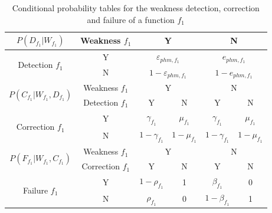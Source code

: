 \renewcommand{\arraystretch}{1.5}
\begin{table}[t] \small
\centering
\caption{Conditional probability tables for the weakness detection, correction and failure of a function $f_1$}
\label{tab:cpt_dcf}
\begin{tabular}{|c|c|c|c|c|c|}
\hline
$P(D_{f_1} | W_{f_1})$                           & Weakness $f_1$   & \multicolumn{2}{c|}{Y}                          & \multicolumn{2}{c|}{N}                \\ \hline
\multirow{2}{*}{Detection $f_1$}                 & Y                & \multicolumn{2}{c|}{$\varepsilon_{phm, f_1}$}   & \multicolumn{2}{c|}{$e_{phm, f_1}$}   \\ \cline{2-6} 
                                                 & N                & \multicolumn{2}{c|}{$1-\varepsilon_{phm, f_1}$} & \multicolumn{2}{c|}{$1-e_{phm, f_1}$} \\ \hline \hline
\multirow{2}{*}{$P(C_{f_1} | W_{f_1}, D_{f_1})$} & Weakness $f_1$   & \multicolumn{2}{c|}{Y}                          & \multicolumn{2}{c|}{N}                \\ \cline{2-6} 
                                                 & Detection $f_1$  & Y                        & N                    & Y                   & N               \\ \hline
\multirow{2}{*}{Correction $f_1$}                & Y                & $\gamma_{f_1}$           & $\mu_{f_1}$          & $\gamma_{f_1}$      & $\mu_{f_1}$     \\ \cline{2-6} 
                                                 & N                & $1-\gamma_{f_1}$         & $1-\mu_{f_1}$        & $1-\gamma_{f_1}$    & $1-\mu_{f_1}$   \\ \hline \hline
\multirow{2}{*}{$P(F_{f_1} | W_{f_1}, C_{f_1})$} & Weakness $f_1$   & \multicolumn{2}{c|}{Y}                          & \multicolumn{2}{c|}{N}                \\ \cline{2-6} 
                                                 & Correction $f_1$ & Y                        & N                    & Y                   & N               \\ \hline
\multirow{2}{*}{Failure $f_1$}                   & Y                & $1-\rho_{f_1}$           & 1                    & $\beta_{f_1}$       & 0               \\ \cline{2-6} 
                                                 & N                & $\rho_{f_1}$             & 0                    & $1-\beta_{f_1}$     & 1               \\ \hline
\end{tabular}
\end{table}

